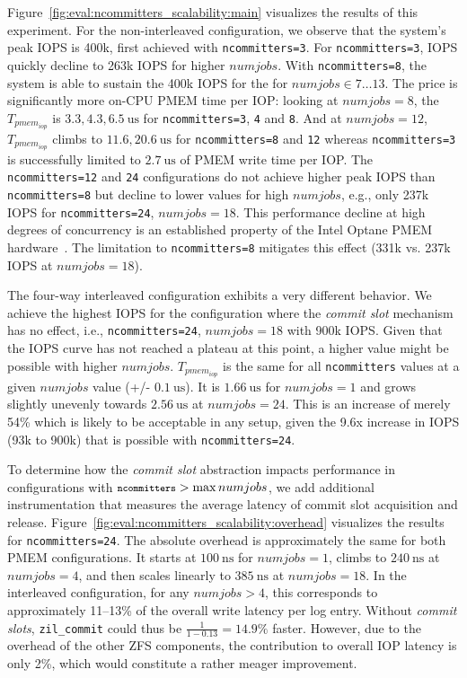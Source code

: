 \documentclass[12pt,a4paper,twoside]{book}
\begin{document}
Figure~\ref{fig:eval:ncommitters_scalability:main} visualizes the results of this experiment.
For the non-interleaved configuration, we observe that the system's peak IOPS is 400k, first achieved with \lstinline{ncommitters=3}.
For \lstinline{ncommitters=3}, IOPS quickly decline to 263k IOPS for higher $numjobs$.
With \lstinline{ncommitters=8}, the system is able to sustain the 400k IOPS for the for $numjobs \in 7 \dots 13$.
The price is significantly more on-CPU PMEM time per IOP:
looking at $numjobs = 8$, the $T_{pmem_{iop}}$ is $3.3, 4.3, 6.5~\text{us}$ for \lstinline{ncommitters=3}, \lstinline{4} and \lstinline{8}.
And at $numjobs = 12$, $T_{pmem_{iop}}$ climbs to $11.6, 20.6~\text{us}$ for \lstinline{ncommitters=8} and \lstinline{12} whereas \lstinline{ncommitters=3} is successfully limited to $2.7~\text{us}$ of PMEM write time per IOP.
The \lstinline{ncommitters=12} and \lstinline{24} configurations do not achieve higher peak IOPS than \lstinline{ncommitters=8} but decline to lower values for high $numjobs$, e.g., only 237k IOPS for \lstinline{ncommitters=24}, $numjobs = 18$.
This performance decline at high degrees of concurrency is an established property of the Intel Optane PMEM hardware~\cite{yangEmpiricalGuideBehavior2020}.
The limitation to \lstinline{ncommitters=8} mitigates this effect (331k vs. 237k IOPS at $numjobs = 18$).

The four-way interleaved configuration exhibits a very different behavior.
We achieve the highest IOPS for the configuration where the \textit{commit slot} mechanism has no effect, i.e., \lstinline{ncommitters=24}, $numjobs = 18$ with 900k IOPS.
Given that the IOPS curve has not reached a plateau at this point, a higher value might be possible with higher $numjobs$.
$T_{pmem_{iop}}$ is the same for all \lstinline{ncommitters} values at a given $numjobs$ value (+/- $0.1~\text{us}$).
It is $1.66~\text{us}$ for $numjobs = 1$ and grows slightly unevenly towards $2.56~\text{us}$ at $numjobs = 24$.
This is an increase of merely 54\% which is likely to be acceptable in any setup, given the 9.6x increase in IOPS (93k to 900k) that is possible with \lstinline{ncommitters=24}.

To determine how the \textit{commit slot} abstraction impacts performance in configurations with ${\texttt{\footnotesize ncommitters}} > \max numjobs$, we add additional instrumentation that measures the average latency of commit slot acquisition and release.
Figure~\ref{fig:eval:ncommitters_scalability:overhead} visualizes the results for \lstinline{ncommitters=24}.
The absolute overhead is approximately the same for both PMEM configurations.
It starts at $100~\text{ns}$ for $numjobs = 1$, climbs to $240~\text{ns}$ at $numjobs = 4$, and then scales linearly to $385~\text{ns}$ at $numjobs = 18$.
In the interleaved configuration, for any $numjobs > 4$, this corresponds to approximately 11--13\% of the overall write latency per log entry.
Without \textit{commit slots}, \lstinline{zil_commit} could thus be $\frac{1}{1 - 0.13} = 14.9\%$ faster.
However, due to the overhead of the other ZFS components, the contribution to overall IOP latency is only 2\%, which would constitute a rather meager improvement.
\end{document}
